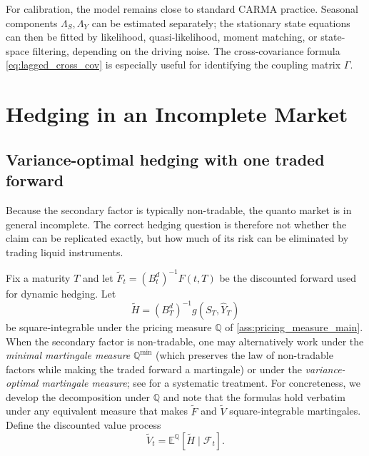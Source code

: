 \documentclass[10pt,a4paper,reqno]{amsart}
\newcommand{\E}{\mathbb{E}}
\newcommand{\Q}{\mathbb{Q}}
\newcommand{\F}{\mathcal{F}}
\newcommand{\1}{\mathbbm{1}}
\begin{document}
For calibration, the model remains close to standard CARMA practice. Seasonal
components \(\Lambda_S,\Lambda_Y\) can be estimated separately; the stationary
state equations can then be fitted by likelihood, quasi-likelihood, moment
matching, or state-space filtering, depending on the driving noise. The
cross-covariance formula \eqref{eq:lagged_cross_cov} is especially useful for
identifying the coupling matrix \(\Gamma\).

\section{Hedging in an Incomplete Market}\label{sec:hedging-strategies}

\subsection{Variance-optimal hedging with one traded forward}

Because the secondary factor is typically non-tradable, the quanto market is in
general incomplete. The correct hedging question is therefore not whether the
claim can be replicated exactly, but how much of its risk can be eliminated by
trading liquid instruments.

Fix a maturity \(T\) and let \(\widetilde{F}_t = (B_t^d)^{-1}F(t,T)\) be the
discounted forward used for dynamic hedging. Let
\[
\widetilde{H} = (B_T^d)^{-1} g(S_T,\widehat{Y}_T)
\]
be square-integrable under the pricing measure \(\Q\) of
\ref{ass:pricing_measure_main}. When the secondary
factor is non-tradable, one may alternatively work under the \emph{minimal
martingale measure} \(\Q^{\min}\) (which preserves the law of non-tradable
factors while making the traded forward a martingale) or under the
\emph{variance-optimal martingale measure}; see \citet{Sch01} for a systematic
treatment. For concreteness, we develop the decomposition under \(\Q\) and
note that the formulas hold verbatim under any equivalent measure that makes
\(\widetilde{F}\) and \(\widetilde{V}\) square-integrable martingales. Define
the discounted value process
\[
\widetilde{V}_t = \E^{\Q}[\widetilde{H}\mid\F_t].
\]
\end{document}
